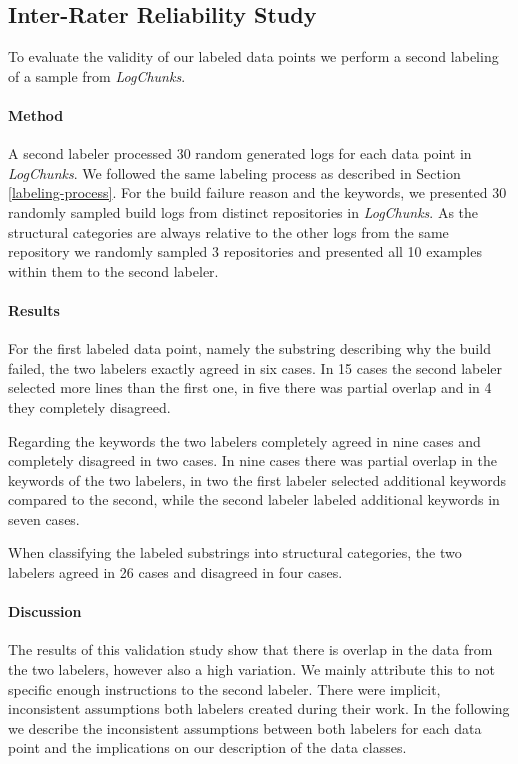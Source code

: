 \documentclass[\myrootdir/main.tex]{subfiles}
\begin{document}
\subsection{Inter-Rater Reliability Study}
To evaluate the validity of our labeled data points we perform a second labeling of a sample from \emph{LogChunks}.

\paragraph{Method}
A second labeler processed 30 random generated logs for each data point in \emph{LogChunks}.
We followed the same labeling process as described in Section \ref{labeling-process}.
For the build failure reason and the keywords, we presented 30 randomly sampled build logs from distinct repositories in \emph{LogChunks}.
As the structural categories are always relative to the other logs from the same repository we randomly sampled 3 repositories and presented all 10 examples within them to the second labeler.

\paragraph{Results}
For the first labeled data point, namely the substring describing why the build failed, the two labelers exactly agreed in six cases.
In 15 cases the second labeler selected more lines than the first one, in five there was partial overlap and in 4 they completely disagreed.

Regarding the keywords the two labelers completely agreed in nine cases and completely disagreed in two cases.
In nine cases there was partial overlap in the keywords of the two labelers, in two the first labeler selected additional keywords compared to the second, while the second labeler labeled additional keywords in seven cases.

When classifying the labeled substrings into structural categories, the two labelers agreed in 26 cases and disagreed in four cases.

\paragraph{Discussion}
The results of this validation study show that there is overlap in the data from the two labelers, however also a high variation.
We mainly attribute this to not specific enough instructions to the second labeler.
There were implicit, inconsistent assumptions both labelers created during their work.
In the following we describe the inconsistent assumptions between both labelers for each data point and the implications on our description of the data classes.
\end{document}
